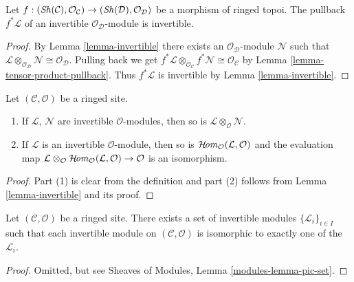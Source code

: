 \begin{lemma}
\label{lemma-pullback-invertible}
Let $f : (\mathop{\mathit{Sh}}\nolimits(\mathcal{C}), \mathcal{O}_\mathcal{C}) \to
(\mathop{\mathit{Sh}}\nolimits(\mathcal{D}), \mathcal{O}_\mathcal{D})$ be a
morphism of ringed topoi. The pullback $f^*\mathcal{L}$ of an
invertible $\mathcal{O}_\mathcal{D}$-module is invertible.
\end{lemma}

\begin{proof}
By Lemma \ref{lemma-invertible}
there exists an $\mathcal{O}_\mathcal{D}$-module $\mathcal{N}$ such that
$\mathcal{L} \otimes_{\mathcal{O}_\mathcal{D}} \mathcal{N} \cong
\mathcal{O}_\mathcal{D}$. Pulling back we get
$f^*\mathcal{L} \otimes_{\mathcal{O}_\mathcal{C}} f^*\mathcal{N} \cong
\mathcal{O}_\mathcal{C}$
by Lemma \ref{lemma-tensor-product-pullback}.
Thus $f^*\mathcal{L}$ is invertible by Lemma \ref{lemma-invertible}.
\end{proof}

\begin{lemma}
\label{lemma-constructions-invertible}
Let $(\mathcal{C}, \mathcal{O})$ be a ringed site.
\begin{enumerate}
\item If $\mathcal{L}$, $\mathcal{N}$ are invertible
$\mathcal{O}$-modules, then so is
$\mathcal{L} \otimes_\mathcal{O} \mathcal{N}$.
\item If $\mathcal{L}$ is an invertible
$\mathcal{O}$-module, then so is
$\mathop{\mathcal{H}\!\mathit{om}}\nolimits_\mathcal{O}(\mathcal{L}, \mathcal{O})$ and the evaluation map
$\mathcal{L} \otimes_\mathcal{O}
\mathop{\mathcal{H}\!\mathit{om}}\nolimits_\mathcal{O}(\mathcal{L}, \mathcal{O}) \to \mathcal{O}$
is an isomorphism.
\end{enumerate}
\end{lemma}

\begin{proof}
Part (1) is clear from the definition and part (2) follows from
Lemma \ref{lemma-invertible} and its proof.
\end{proof}

\begin{lemma}
\label{lemma-pic-set}
Let $(\mathcal{C}, \mathcal{O})$ be a ringed site.
There exists a set of invertible modules $\{\mathcal{L}_i\}_{i \in I}$
such that each invertible module on $(\mathcal{C}, \mathcal{O})$
is isomorphic to exactly one of the $\mathcal{L}_i$.
\end{lemma}

\begin{proof}
Omitted, but see Sheaves of Modules, Lemma \ref{modules-lemma-pic-set}.
\end{proof}

